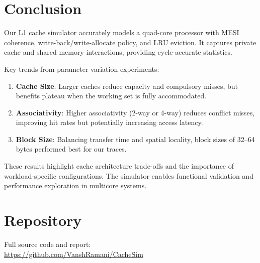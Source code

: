 \documentclass[11pt]{article}
\begin{document}
\section{Conclusion}

Our L1 cache simulator accurately models a quad-core processor with MESI coherence, write-back/write-allocate policy, and LRU eviction. It captures private cache and shared memory interactions, providing cycle-accurate statistics.

Key trends from parameter variation experiments:
\begin{enumerate}
    \item \textbf{Cache Size}: Larger caches reduce capacity and compulsory misses, but benefits plateau when the working set is fully accommodated.
    \item \textbf{Associativity}: Higher associativity (2-way or 4-way) reduces conflict misses, improving hit rates but potentially increasing access latency.
    \item \textbf{Block Size}: Balancing transfer time and spatial locality, block sizes of 32–64 bytes performed best for our traces.
\end{enumerate}

These results highlight cache architecture trade-offs and the importance of workload-specific configurations. The simulator enables functional validation and performance exploration in multicore systems.

\section{Repository}
Full source code and report: \\
\url{https://github.com/VanshRamani/CacheSim}
\end{document}
